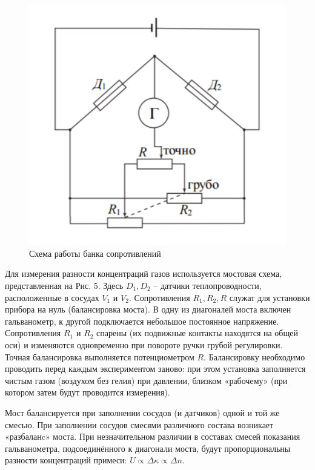 \documentclass[a4paper,12pt]{article}
\begin{document}
\begin{figure} 
	\centering 
	\includegraphics[scale=0.18]{2.jpg} 
	\caption{Схема работы банка сопротивлений} 
\end{figure}

Для измерения разности концентраций газов используется мостовая схема, представленная на Рис. 5. Здесь $D_1, D_2$ -- датчики теплопроводности, расположенные в сосудах $V_1$ и $V_2$. Сопротивления $R_1, R_2, R$ служат для установки прибора на нуль (балансировка моста). В одну из диагоналей моста включен гальванометр, к другой подключается небольшое постоянное напряжение. Сопротивления $R_1$ и $R_2$ спарены (их подвижные контакты находятся на общей оси) и изменяются одновременно при повороте ручки грубой регулировки. Точная балансировка выполняется потенциометром $R$. Балансировку необходимо проводить перед каждым экспериментом заново: при этом установка заполняется чистым газом (воздухом без гелия) при давлении, близком «рабочему» (при котором затем будут проводится измерения).

Мост балансируется при заполнении сосудов (и датчиков) одной и той же смесью. При заполнении сосудов смесями различного состава возникает «разбаланc» моста. При незначительном различии в составах смесей показания гальванометра, подсоединённого к диагонали моста, будут пропорциональны разности концентраций примеси: $U \propto \Delta \kappa \propto \Delta n$.
 	
\end{document}
